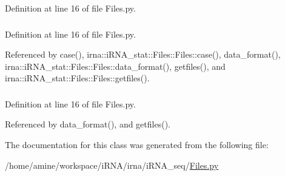 \-Definition at line 16 of file \-Files.\-py.

\hypertarget{classirna_1_1iRNA__seq_1_1Files_1_1Files_a275261851a81303f889a018e0206e25d}{
\subsubsection[{results}]{}}
\label{classirna_1_1iRNA__seq_1_1Files_1_1Files_a275261851a81303f889a018e0206e25d}


\-Definition at line 16 of file \-Files.\-py.



\-Referenced by case(), irna\-::i\-R\-N\-A\-\_\-stat\-::\-Files\-::\-Files\-::case(), data\-\_\-format(), irna\-::i\-R\-N\-A\-\_\-stat\-::\-Files\-::\-Files\-::data\-\_\-format(), getfiles(), and irna\-::i\-R\-N\-A\-\_\-stat\-::\-Files\-::\-Files\-::getfiles().

\hypertarget{classirna_1_1iRNA__seq_1_1Files_1_1Files_ae3132855c27a91d36ab8959c087c1096}{
\subsubsection[{s\-R\-N\-A\-\_\-file}]{}}
\label{classirna_1_1iRNA__seq_1_1Files_1_1Files_ae3132855c27a91d36ab8959c087c1096}


\-Definition at line 16 of file \-Files.\-py.



\-Referenced by data\-\_\-format(), and getfiles().



\-The documentation for this class was generated from the following file\-:\begin{DoxyCompactItemize}
\item 
/home/amine/workspace/i\-R\-N\-A/irna/i\-R\-N\-A\-\_\-seq/\hyperlink{iRNA__seq_2Files_8py}{\-Files.\-py}\end{DoxyCompactItemize}
